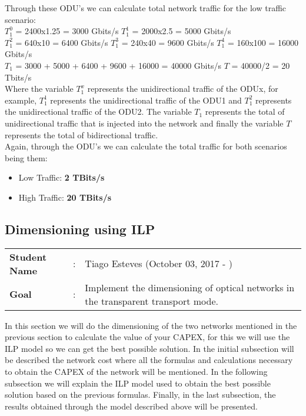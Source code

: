 Through these ODU's we can calculate total network traffic for the low traffic scenario:\\

$T_1^0$ = 2400x1.25 = 3000 Gbits/s \quad
$T_1^1$ = 2000x2.5 = 5000 Gbits/s \\

$T_1^2$ = 640x10 = 6400 Gbits/s \quad
$T_1^3$ = 240x40 = 9600 Gbits/s \quad
$T_1^4$ = 160x100 = 16000 Gbits/s \\

$T_{1}$ = 3000 + 5000 + 6400 + 9600 + 16000 = 40000 Gbits/s \qquad
$T$ = 40000/2 = 20 Tbits/s\\

Where the variable $T_1^x$ represents the unidirectional traffic of the ODUx, for example, $T_1^1$ represents the unidirectional traffic of the ODU1 and $T_1^2$ represents the unidirectional traffic of the ODU2. The variable $T_{1}$ represents the total of unidirectional traffic that is injected into the network and finally the variable $T$ represents the total of bidirectional traffic.\\

Again, through the ODU's we can calculate the total traffic for both scenarios being them:
\begin{itemize}
  \item Low Traffic: \textbf{2 TBits/s}
  \item High Traffic: \textbf{20 TBits/s}
\end{itemize}


\subsection{Dimensioning using ILP}
\begin{tcolorbox}	
\begin{tabular}{p{2.75cm} p{0.2cm} p{10.5cm}} 	
\textbf{Student Name}  &:& Tiago Esteves    (October 03, 2017 - )\\
\textbf{Goal}          &:& Implement the dimensioning of optical networks in the transparent transport mode.
\end{tabular}
\end{tcolorbox}

\vspace{11pt}

In this section we will do the dimensioning of the two networks mentioned in the previous section to calculate the value of your CAPEX, for this we will use the ILP model so we can get the best possible solution.
In the initial subsection will be described the network cost where all the formulas and calculations necessary to obtain the CAPEX of the network will be mentioned.
In the following subsection we will explain the ILP model used to obtain the best possible solution based on the previous formulas.
Finally, in the last subsection, the results obtained through the model described above will be presented.

